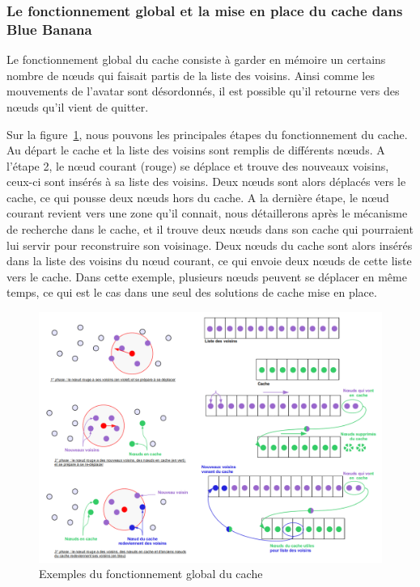 \subsubsection{Le fonctionnement global et la mise en place du cache dans Blue Banana}
Le fonctionnement global du cache consiste à garder en mémoire un certains nombre de nœuds qui faisait partis de la liste des voisins. Ainsi comme les mouvements de l'avatar sont désordonnés, il est possible qu'il retourne vers des nœuds qu'il vient de quitter. 
\par Sur la figure~\ref{cacheW}, nous pouvons les principales étapes du fonctionnement du cache. Au départ le cache et la liste des voisins sont remplis de différents nœuds. A l'étape 2, le nœud courant (rouge) se déplace et trouve des nouveaux voisins, ceux-ci sont insérés à sa liste des voisins. Deux nœuds sont alors déplacés vers le cache, ce qui pousse deux nœuds hors du cache. A la dernière étape, le nœud courant revient vers une zone qu'il connait, nous détaillerons après le mécanisme de recherche dans le cache, et il trouve deux nœuds dans son cache qui pourraient lui servir pour reconstruire son voisinage. Deux nœuds du cache sont alors insérés dans la liste des voisins du nœud courant, ce qui envoie deux nœuds de cette liste vers le cache. Dans cette exemple, plusieurs nœuds peuvent se déplacer en même temps, ce qui est le cas dans une seul des solutions de cache mise en place.
	\begin{figure}[!h]
        \centering
        \includegraphics[scale=0.35]{./Ressources/Images/cacheWextends.png}
        \caption{Exemples du fonctionnement global du cache}
        \label{cacheW}
        \end{figure} 
